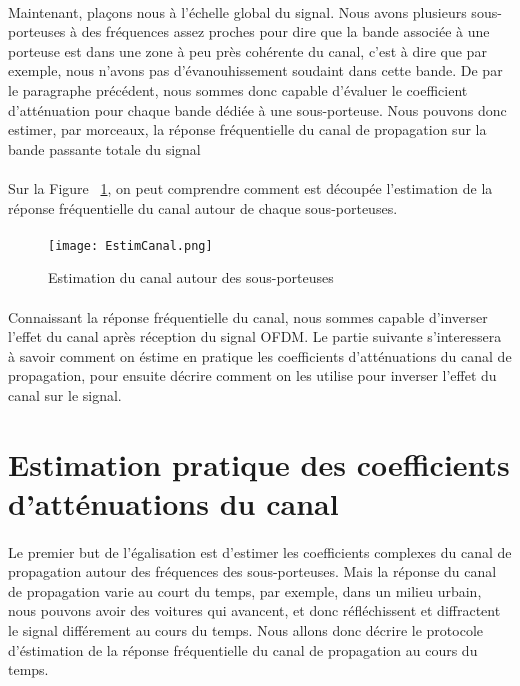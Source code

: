 \paragraph{}
Maintenant, plaçons nous à l'échelle global du signal. Nous avons plusieurs sous-porteuses à des fréquences assez proches pour dire que la bande associée à une porteuse est dans une zone à peu près cohérente du canal, c'est à dire que par exemple, nous n'avons pas d'évanouhissement soudaint dans cette bande. De par le paragraphe précédent, nous sommes donc capable d'évaluer le coefficient d'atténuation pour chaque bande dédiée à une sous-porteuse. Nous pouvons donc estimer, par morceaux, la réponse fréquentielle du canal de propagation sur la bande passante totale du signal  
\paragraph{}	
	Sur la Figure ~\ref{EstimPort}, on peut comprendre comment est découpée l'estimation de la réponse fréquentielle du canal autour de chaque sous-porteuses.

\paragraph{}
\vspace{1\baselineskip}
\begin{figure}[!h]
  \centering
  \texttt{[image: EstimCanal.png]}
  \caption{Estimation du canal autour des sous-porteuses }
	\label{EstimPort} 
\end{figure}

\paragraph{}
Connaissant la réponse fréquentielle du canal, nous sommes capable d'inverser l'effet du canal après réception du signal OFDM. Le partie suivante s'interessera à savoir comment on éstime en pratique les coefficients d'atténuations du canal de propagation, pour ensuite décrire comment on les utilise pour inverser l'effet du canal sur le signal.


\section{Estimation pratique des coefficients d'atténuations du canal}

\paragraph{}
Le premier but de l'égalisation est d'estimer les coefficients complexes du canal de propagation autour des fréquences des sous-porteuses. Mais la réponse du canal de propagation varie au court du temps, par exemple, dans un milieu urbain, nous pouvons avoir des voitures qui avancent, et donc réfléchissent et diffractent le signal différement au cours du temps. Nous allons donc décrire le protocole d'éstimation de la réponse fréquentielle du canal de propagation au cours du temps.
